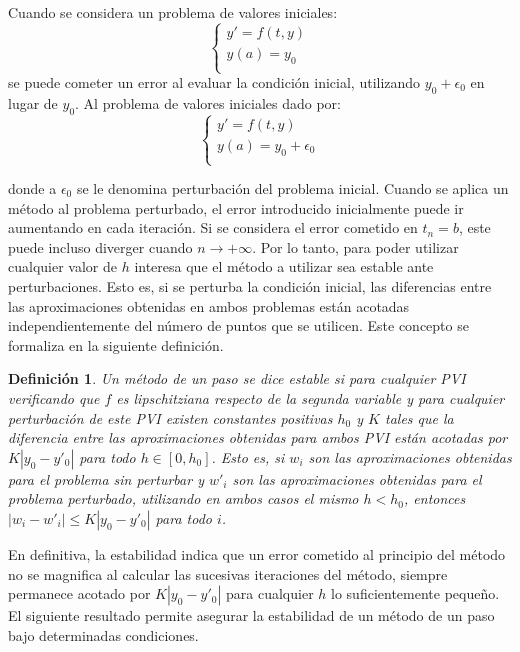 \documentclass{article}
\theoremstyle{theorem-style}  %
\theoremstyle{definition-style}
\newtheorem{definition}{Definición}[section]
\theoremstyle{example-style}
\begin{document}
    Cuando se considera un problema de valores iniciales:
     \begin{equation*}
		\begin{cases}
			y' = f(t, y) \\
			y(a) = y_0 \\
		\end{cases}
	\end{equation*}
	se puede cometer un error al evaluar la condición inicial, utilizando $y_0 + \epsilon_0$ en lugar de $y_0$. Al problema de valores iniciales dado por:
    \begin{equation*}
		\begin{cases}
			y' = f(t, y) \\
			y(a) = y_0 + \epsilon_0 \\
		\end{cases}
	\end{equation*}

	donde a $\epsilon_0$ se le denomina perturbación del problema inicial. Cuando se aplica un método al problema perturbado, el error introducido inicialmente puede ir aumentando en cada iteración. Si se considera el error cometido en $t_n = b$, este puede incluso diverger cuando $n \rightarrow +\infty$. Por lo tanto, para poder utilizar cualquier valor de $h$ interesa que el método a utilizar sea estable ante perturbaciones. Esto es, si se perturba la condición inicial, las diferencias entre las aproximaciones obtenidas en ambos problemas están acotadas independientemente del número de puntos que se utilicen. Este concepto se formaliza en la siguiente definición.

	\begin{definition}
		Un método de un paso se dice estable si para cualquier PVI verificando que $f$ es lipschitziana respecto de la segunda variable y para cualquier perturbación de este PVI existen constantes positivas $h_0$ y $K$ tales que la diferencia entre las aproximaciones obtenidas para ambos PVI están acotadas por $K |y_0 - y'_0|$ para todo $h \in [0,h_0]$. Esto es, si $w_i$ son las aproximaciones obtenidas para el problema sin perturbar y $w'_i$ son las aproximaciones obtenidas para el problema perturbado, utilizando en ambos casos el mismo $h < h_0$, entonces $\left|w_i - w'_i\right| \le K |y_0 - y'_0|$ para todo $i$.
	\end{definition}

	En definitiva, la estabilidad indica que un error cometido al principio del método no se magnifica al calcular las sucesivas iteraciones del método, siempre permanece acotado por $K |y_0 - y'_0|$ para cualquier $h$ lo suficientemente pequeño. El siguiente resultado permite asegurar la estabilidad de un método de un paso bajo determinadas condiciones.
\end{document}
